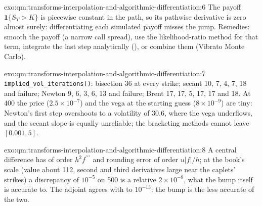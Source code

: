 \begin{solution}{exo:qm:transforms-interpolation-and-algorithmic-differentiation:6}
The payoff $\mathbf 1\{S_T > K\}$ is piecewise constant in the path, so its pathwise derivative is zero almost surely: differentiating each simulated payoff misses the jump. Remedies: smooth the payoff (a
narrow call spread), use the likelihood-ratio method for that term, integrate the last step analytically (), or combine them (Vibrato Monte Carlo).
\end{solution}

\begin{solution}{exo:qm:transforms-interpolation-and-algorithmic-differentiation:7}
\texttt{implied\_vol\_iterations()}: bisection 36 at every strike; secant 10, 7, 4, 7, 18 and failure; Newton 9, 6, 3, 6, 13 and failure; Brent 17, 17, 5, 17, 17 and 18. At 400 the price
($2.5 \times 10^{-7}$) and the vega at the starting guess ($8 \times 10^{-9}$) are tiny: Newton's first step overshoots to a volatility of 30.6, where the vega underflows, and the secant slope is equally
unreliable; the bracketing methods cannot leave $[0.001, 5]$.
\end{solution}

\begin{solution}{exo:qm:transforms-interpolation-and-algorithmic-differentiation:8}
A central difference has  of order $h^2f^{\prime\prime\prime}$ and rounding error of order $u|f|/h$; at the book's scale (value about 112, second and third derivatives large near the caplets' strikes) a
discrepancy of $10^{-5}$ on 500 is a relative $2 \times 10^{-8}$, what the bump itself is accurate to. The adjoint agrees with  to $10^{-13}$: the bump is the less accurate of the two.
\end{solution}

